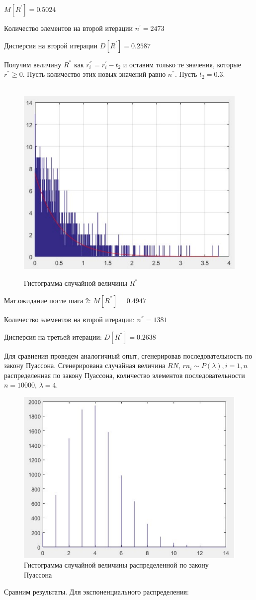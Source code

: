$M[R^{'}]= 0.5024$

Количество элементов на второй итерации $n^{'}=2473$

Дисперсия на второй итерации $D[R^{'}] = 0.2587 $

Получим величину $R^{''}$ как $r_{i}^{''}{}^ {}=r_{i}^{'}-t_{2}$
и оставим только те значения, которые $r^{''}\geq0$. Пусть количество
этих новых значений равно $n^{''}$. Пусть $t_{2}=0.3.$ 
\begin{figure}[h]
	\centering\
	\includegraphics[width=0.4\linewidth]{img/kich_bur/image4}
	\caption{Гистограмма случайной величины $R^{''}$ }
	\label{fig:img4}
\end{figure}

Мат.ожидание после шага 2: $M[R^{''}]= 0.4947 $

Количество элементов на второй итерации: $n^{''}= 1381 $

Дисперсия на третьей итерации: $D[R^{''}]= 0.2638 $

Для сравнения проведем аналогичный опыт, сгенерировав последовательность
по закону Пуассона. Сгенерирована случайная величина $ RN $, $rn_{i}\sim
P(\lambda),i=1,n$ распределенная по закону Пуассона, количество элементов
последовательности $n=10000$, $\lambda=4$.
 
\begin{figure}[h]
	\centering
	\includegraphics[width=0.4\linewidth]{img/kich_bur/image5} 
	\caption{Гистограмма случайной величины распределенной по закону Пуассона}
	\label{fig:img5}
\end{figure}

Сравним результаты. Для экспоненциального распределения: 

